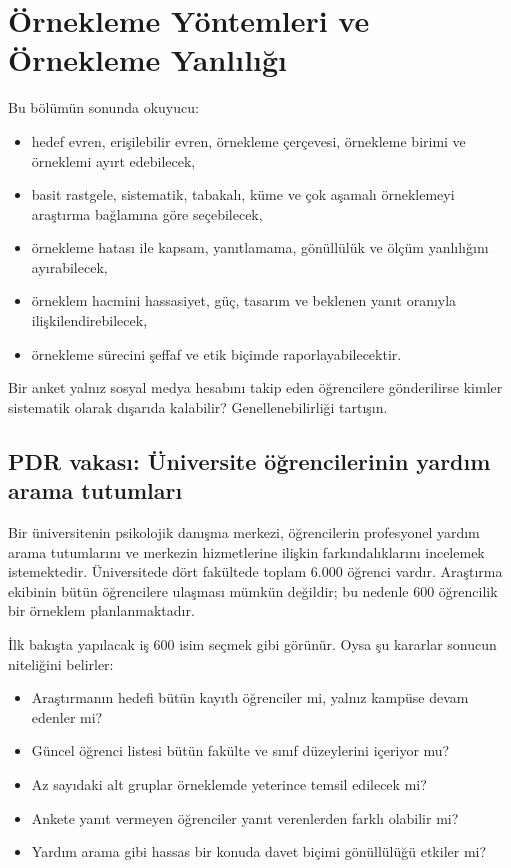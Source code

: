 \chapter{Örnekleme Yöntemleri ve Örnekleme Yanlılığı}

\begin{hedefler}
Bu bölümün sonunda okuyucu:
\begin{itemize}
  \item hedef evren, erişilebilir evren, örnekleme çerçevesi, örnekleme birimi ve örneklemi ayırt edebilecek,
  \item basit rastgele, sistematik, tabakalı, küme ve çok aşamalı örneklemeyi araştırma bağlamına göre seçebilecek,
  \item örnekleme hatası ile kapsam, yanıtlamama, gönüllülük ve ölçüm yanlılığını ayırabilecek,
  \item örneklem hacmini hassasiyet, güç, tasarım ve beklenen yanıt oranıyla ilişkilendirebilecek,
  \item örnekleme sürecini şeffaf ve etik biçimde raporlayabilecektir.
\end{itemize}
\end{hedefler}

\begin{hazirlik}
Bir anket yalnız sosyal medya hesabını takip eden öğrencilere gönderilirse
kimler sistematik olarak dışarıda kalabilir? Genellenebilirliği tartışın.
\end{hazirlik}

\section{PDR vakası: Üniversite öğrencilerinin yardım arama tutumları}

Bir üniversitenin psikolojik danışma merkezi, öğrencilerin profesyonel yardım
arama tutumlarını ve merkezin hizmetlerine ilişkin farkındalıklarını
incelemek istemektedir. Üniversitede dört fakültede toplam 6.000 öğrenci
vardır. Araştırma ekibinin bütün öğrencilere ulaşması mümkün değildir; bu
nedenle 600 öğrencilik bir örneklem planlanmaktadır.

İlk bakışta yapılacak iş 600 isim seçmek gibi görünür. Oysa şu kararlar
sonucun niteliğini belirler:

\begin{itemize}
  \item Araştırmanın hedefi bütün kayıtlı öğrenciler mi, yalnız kampüse devam edenler mi?
  \item Güncel öğrenci listesi bütün fakülte ve sınıf düzeylerini içeriyor mu?
  \item Az sayıdaki alt gruplar örneklemde yeterince temsil edilecek mi?
  \item Ankete yanıt vermeyen öğrenciler yanıt verenlerden farklı olabilir mi?
  \item Yardım arama gibi hassas bir konuda davet biçimi gönüllülüğü etkiler mi?
\end{itemize}

